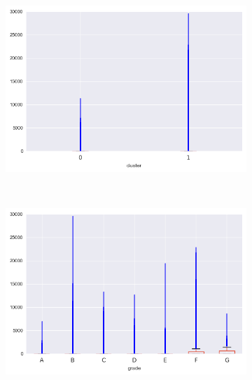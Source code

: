 \begin{anexosenv}
\begin{figure}[t!]
\begin{subfigure}[t]{0.5\textwidth}
            \centerline{\includegraphics[width=1.05\textwidth]{img/recoveries_by_cluster}}
        \end{subfigure}%
        ~ 
        \begin{subfigure}[t]{0.5\textwidth}
            \centering
   
            \centerline{\includegraphics[width=1.05\textwidth]{img/recoveries_by_grade}}

        \end{subfigure}
\end{figure}


\begin{figure}[t!]
    \centering
        \caption{open\textunderscore acc }
        \begin{subfigure}[t]{0.5\textwidth}
            \centering


\end{subfigure}
\end{figure}
\end{anexosenv}
